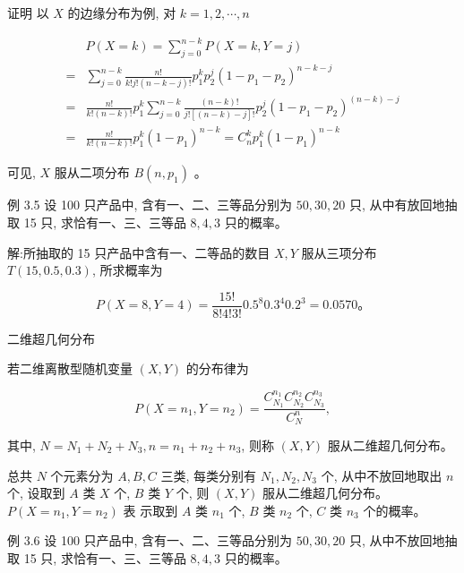 \documentclass{beamer}
\begin{document}
	\begin{frame}
		证明 以 $X$ 的边缘分布为例, 对 $k=1,2, \cdots, n$
		
		$$
		\begin{aligned}
			& P(X=k)=\sum_{j=0}^{n-k} P(X=k, Y=j) \\
			= & \sum_{j=0}^{n-k} \frac{n !}{k ! j !(n-k-j) !} p_{1}^{k} p_{2}^{j}\left(1-p_{1}-p_{2}\right)^{n-k-j} \\
			= & \frac{n !}{k !(n-k) !} p_{1}^{k} \sum_{j=0}^{n-k} \frac{(n-k) !}{j ![(n-k)-j] !} p_{2}^{j}\left(1-p_{1}-p_{2}\right)^{(n-k)-j} \\
			= & \frac{n !}{k !(n-k) !} p_{1}^{k}\left(1-p_{1}\right)^{n-k}=C_{n}^{k} p_{1}^{k}\left(1-p_{1}\right)^{n-k}
		\end{aligned}
		$$
		
		可见, $X$ 服从二项分布 $B\left(n, p_{1}\right)$ 。
	\end{frame}
		
	\begin{frame}
		例 3.5 设 100 只产品中, 含有一、二、三等品分别为 $50,30,20$ 只, 从中有放回地抽 取 15 只, 求恰有一、三、三等品 $8,4,3$ 只的概率。
	\end{frame}
	
	\begin{frame}
		解:所抽取的 15 只产品中含有一、二等品的数目 $X, Y$ 服从三项分布 $T(15,0.5,0.3)$, 所求概率为
		
		$$
		P(X=8, Y=4)=\frac{15 !}{8 ! 4 ! 3 !} 0.5^{8} 0.3^{4} 0.2^{3}=0.0570 。
		$$
	\end{frame}
	
	\begin{frame}
		二维超几何分布
		
		若二维离散型随机变量 $(X, Y)$ 的分布律为
		
		$$
		P\left(X=n_{1}, Y=n_{2}\right)=\frac{C_{N_{1}}^{n_{1}} C_{N_{2}}^{n_{2}} C_{N_{3}}^{n_{3}}}{C_{N}^{n}},
		$$
		
		其中, $N=N_{1}+N_{2}+N_{3}, n=n_{1}+n_{2}+n_{3}$, 则称 $(X, Y)$ 服从二维超几何分布。
		
		总共 $N$ 个元素分为 $A, B, C$ 三类, 每类分别有 $N_{1}, N_{2}, N_{3}$ 个, 从中不放回地取出 $n$ 个, 设取到 $A$ 类 $X$ 个, $B$ 类 $Y$ 个, 则 $(X, Y)$ 服从二维超几何分布。 $P\left(X=n_{1}, Y=n_{2}\right)$ 表 示取到 $A$ 类 $n_{1}$ 个, $B$ 类 $n_{2}$ 个, $C$ 类 $n_{3}$ 个的概率。
	\end{frame}
	
	\begin{frame}
		例 3.6 设 100 只产品中, 含有一、二、三等品分别为 $50,30,20$ 只, 从中不放回地抽取 15 只, 求恰有一、三、三等品 $8,4,3$ 只的概率。
	\end{frame}
	
\end{document}

